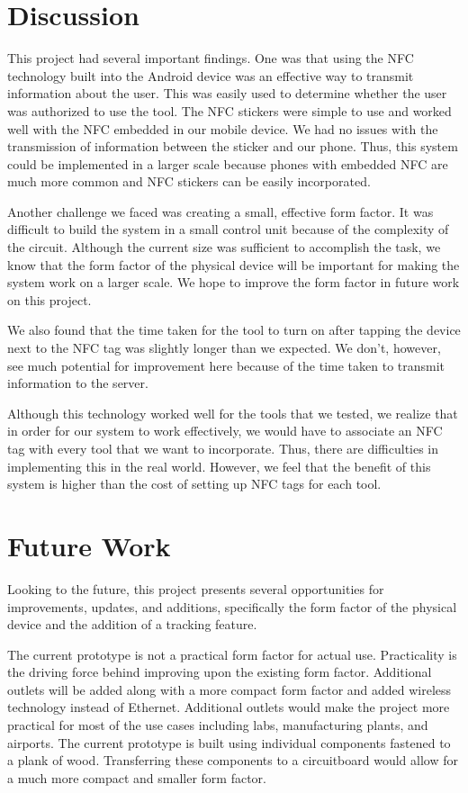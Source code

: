 \documentclass{sigchi}
\begin{document}
\section{Discussion}

This project had several important findings. One was that using the NFC technology built into the Android device was an effective way to transmit information about the user. This was easily used to determine whether the user was authorized to use the tool. The NFC stickers were simple to use and worked well with the NFC embedded in our mobile device. We had no issues with the transmission of information between the sticker and our phone. Thus, this system could be implemented in a larger scale because phones with embedded NFC are much more common and NFC stickers can be easily incorporated.

Another challenge we faced was creating a small, effective form factor. It was difficult to build the system in a small control unit because of the complexity of the circuit. Although the current size was sufficient to accomplish the task, we know that the form factor of the physical device will be important for making the system work on a larger scale. We hope to improve the form factor in future work on this project.

We also found that the time taken for the tool to turn on after tapping the device next to the NFC tag was slightly longer than we expected. We don't, however, see much potential for improvement here because of the time taken to transmit information to the server.

Although this technology worked well for the tools that we tested, we realize that in order for our system to work effectively, we would have to associate an NFC tag with every tool that we want to incorporate. Thus, there are difficulties in implementing this in the real world. However, we feel that the benefit of this system is higher than the cost of setting up NFC tags for each tool.
\section{Future Work}
Looking to the future, this project presents several opportunities for improvements, updates, and additions, specifically the form factor of the physical device and the addition of a tracking feature. 

The current prototype is not a practical form factor for actual use. Practicality is the driving force behind improving upon the existing form factor. Additional outlets will be added along with a more compact form factor and added wireless technology instead of Ethernet. Additional outlets would make the project more practical for most of the use cases including labs, manufacturing plants, and airports. The current prototype is built using individual components fastened to a plank of wood. Transferring these components to a circuitboard would allow for a much more compact and smaller form factor. 
\end{document}
